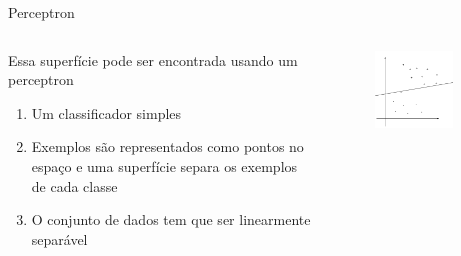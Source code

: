 \documentclass{beamer}
\begin{document}
\begin{frame}{Perceptron}
\begin{columns}
    \begin{column}{.49\textwidth}
    Essa superfície pode ser encontrada usando um perceptron
      \begin{enumerate}
      \item {
        Um classificador simples
      }
      \item {
        Exemplos são representados como pontos no espaço e uma superfície separa os exemplos de cada classe
      }
      \item {
        O conjunto de dados tem que ser linearmente separável
      }
      \end{enumerate}
    \end{column}
    \begin{column}{.49\textwidth}
    \begin{figure}
      \centering
      \includegraphics[width=0.8\textwidth]{perceptron_3.png}
    \end{figure}
    \end{column}
\end{columns}
\end{frame}
\end{document}

